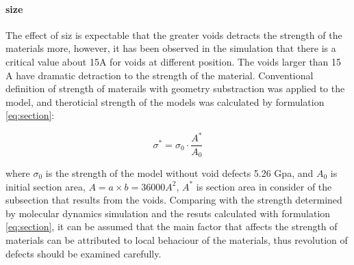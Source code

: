 \documentclass[times,12pt]{elsarticle}
\begin{document}
\paragraph{size} The effect of siz is expectable that the greater voids detracts the strength of the materials more, however, it has been observed in the simulation that there is a critical value about 15A for voids at different position. The voids larger than 15 A have dramatic detraction to the strength of the material. Conventional definition of strength of materails with geometry substraction was applied to the model, and theroticial strength of the models was calculated by formulation \ref{eq:section}:

\begin{equation} \label{eq:section} 
\sigma^* = \sigma_0 \cdot \frac{A^*}{A_0}
\end{equation}

where $\sigma_0$ is the strength of the model without void defects 5.26 Gpa, and $A_0$ is initial section area, $ A = a\times b = 36000 A^2$, $A^* $ is section area in consider of the subsection that results from the voids. Comparing with the strength determined by molecular dynamics simulation and the resuts calculated with formulation \ref{eq:section}, it can be assumed that the main factor that affects the strength of materials can be attributed to local behaciour of the materials, thus revolution of defects should be examined carefully.
\end{document}
